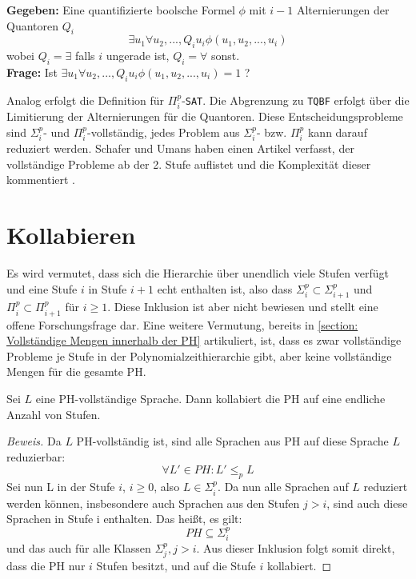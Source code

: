 \begin{definition} \cite{arora_computational_2009}
    \textbf{Gegeben:} Eine quantifizierte boolsche Formel $\phi$ mit $i-1$ Alternierungen der Quantoren $Q_i$ 
    $$
    \exists u_1 \forall u_2, ..., Q_i u_i \phi(u_1, u_2, ..., u_i)
    $$
    wobei $Q_i = \exists $ falls $i$ ungerade ist, $Q_i = \forall$ sonst. \\
    \textbf{Frage:} Ist $\exists u_1 \forall u_2, ..., Q_i u_i \phi(u_1, u_2, ..., u_i) = 1$ ?
\end{definition}

Analog erfolgt die Definition für $\Pi^p_i$-\texttt{SAT}. Die Abgrenzung zu \texttt{TQBF} erfolgt über die Limitierung der Alternierungen für die Quantoren.
Diese Entscheidungsprobleme sind $\Sigma^p_i$- und $\Pi^p_i$-vollständig, jedes Problem aus $\Sigma^p_i$- bzw. $\Pi^p_i$ kann darauf reduziert werden.
Schafer und Umans haben einen Artikel verfasst, der vollständige Probleme ab der 2. Stufe auflistet und die Komplexität dieser kommentiert \cite{schaefer_completeness_nodate}.


\section{Kollabieren} \label{section: Kollabieren der PH}
Es wird vermutet, dass sich die Hierarchie über unendlich viele Stufen verfügt und eine Stufe $i$ in Stufe $i + 1$ echt enthalten ist,
also dass $\Sigma^p_i \subset \Sigma^p_{i+1}$ und $\Pi^p_i \subset \Pi^p_{i+1}$ für $i \geq 1$. Diese Inklusion ist aber nicht bewiesen und stellt eine offene
Forschungsfrage dar. Eine weitere Vermutung, bereits in \ref{section: Vollständige Mengen innerhalb der PH} artikuliert,  ist, dass es zwar vollständige Probleme je Stufe in der Polynomialzeithierarchie gibt, aber keine vollständige Mengen für die gesamte PH.
\begin{theorem}
    Sei $L$ eine PH-vollständige Sprache. Dann kollabiert die PH auf eine endliche Anzahl von Stufen. 
\end{theorem}

\begin{proof}[Beweis]
    Da $L$ PH-vollständig ist, sind alle Sprachen aus PH auf diese Sprache $L$ reduzierbar:
    $$
    \forall L' \in PH: L' \leq_p L
    $$
    Sei nun L in der Stufe $i$, $i \geq 0$, also $L \in \Sigma^p_i$. Da nun alle Sprachen auf $L$ reduziert werden können, insbesondere
    auch Sprachen aus den Stufen $j > i$, sind auch diese Sprachen in Stufe i enthalten.
    Das heißt, es gilt: 
    $$
    PH \subseteq \Sigma^p_i
    $$ 
    und das auch für alle Klassen $\Sigma^p_j, j> i$.
    Aus dieser Inklusion folgt somit direkt, dass die PH nur $i$ Stufen besitzt, und auf die Stufe $i$ kollabiert.
\end{proof}

